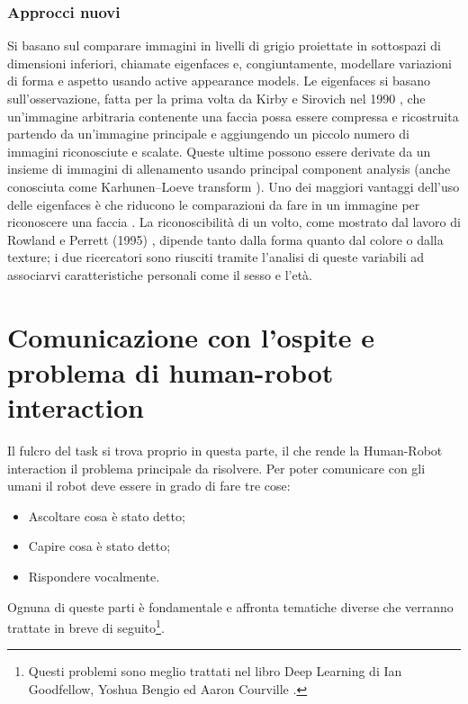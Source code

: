 \documentclass[italian, twoside]{sapthesis} %
\begin{document}
\subsubsection{Approcci nuovi}
Si basano sul comparare immagini in livelli di grigio proiettate in sottospazi di dimensioni inferiori, chiamate eigenfaces e, congiuntamente, modellare variazioni di forma e aspetto usando active appearance models. Le eigenfaces si basano sull’osservazione, fatta per la prima volta da Kirby e Sirovich nel 1990 \cite{kirby1990application}, che un’immagine arbitraria contenente una faccia possa essere compressa e ricostruita partendo da un’immagine principale e aggiungendo un piccolo numero di immagini riconosciute e scalate. Queste ultime possono essere derivate da un insieme di immagini di allenamento usando principal component analysis (anche conosciuta come Karhunen–Loeve transform \cite{kirby1990application}). Uno dei maggiori vantaggi dell’uso delle eigenfaces è che riducono le comparazioni da fare in un immagine per riconoscere una faccia \cite{yu1994face} \cite{lemieux2002experiments}. La riconoscibilità di un volto, come mostrato dal lavoro di Rowland e Perrett (1995) \cite{rowland1995manipulating}, dipende tanto dalla forma quanto dal colore o dalla texture; i due ricercatori sono riusciti tramite l’analisi di queste variabili ad associarvi caratteristiche personali come il sesso e l’età.

\section{Comunicazione con l'ospite e problema di human-robot interaction}
Il fulcro del task si trova proprio in questa parte, il che rende la Human-Robot interaction il problema principale da risolvere. Per poter comunicare con gli umani il robot deve essere in grado di fare tre cose:
\begin{itemize}
    \item Ascoltare cosa è stato detto;
	\item Capire cosa è stato detto;
	\item Rispondere vocalmente.
\end{itemize}
Ognuna di queste parti è fondamentale e affronta tematiche diverse che verranno trattate in breve di seguito\footnote{Questi problemi sono meglio trattati nel libro Deep Learning di Ian Goodfellow, Yoshua Bengio ed Aaron Courville \cite{goodfellow2016deep}.}.
\end{document}

